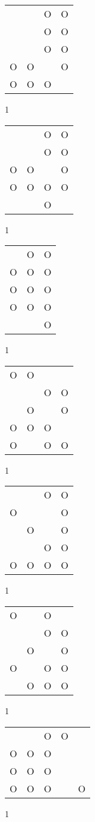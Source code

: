 \begin{tabular}{|m{0.2cm}m{0.2cm}m{0.2cm}m{0.2cm}|}\hline
 & &O&O\\
 & &O&O\\
 & &O&O\\
O&O& &O\\
O&O&O& \\
\hline\end{tabular}1
\begin{tabular}{|m{0.2cm}m{0.2cm}m{0.2cm}m{0.2cm}|}\hline
 & &O&O\\
 & &O&O\\
O&O& &O\\
O&O&O&O\\
 & &O& \\
\hline\end{tabular}1
\begin{tabular}{|m{0.2cm}m{0.2cm}m{0.2cm}|}\hline
 &O&O\\
O&O&O\\
O&O&O\\
O&O&O\\
 & &O\\
\hline\end{tabular}1
\begin{tabular}{|m{0.2cm}m{0.2cm}m{0.2cm}m{0.2cm}|}\hline
O&O& & \\
 & &O&O\\
 &O& &O\\
O&O&O& \\
O& &O&O\\
\hline\end{tabular}1
\begin{tabular}{|m{0.2cm}m{0.2cm}m{0.2cm}m{0.2cm}|}\hline
 & &O&O\\
O& & &O\\
 &O& &O\\
 & &O&O\\
O&O&O&O\\
\hline\end{tabular}1
\begin{tabular}{|m{0.2cm}m{0.2cm}m{0.2cm}m{0.2cm}|}\hline
O& &O& \\
 & &O&O\\
 &O& &O\\
O& &O&O\\
 &O&O&O\\
\hline\end{tabular}1
\begin{tabular}{|m{0.2cm}m{0.2cm}m{0.2cm}m{0.2cm}m{0.2cm}|}\hline
 & &O&O& \\
O&O&O& & \\
O&O&O& & \\
O&O&O& &O\\
\hline\end{tabular}1
